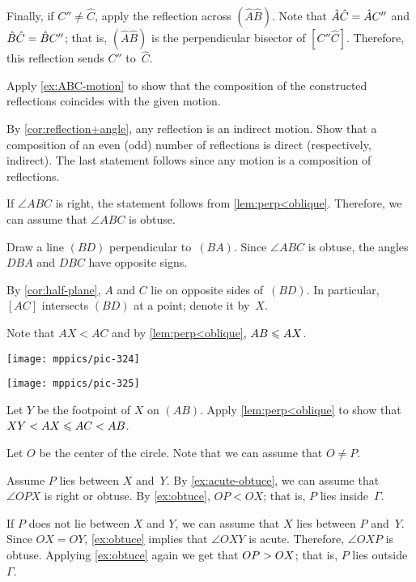 Finally, if $C''\ne \hat C$, apply the reflection across $(\hat A\hat B)$.
Note that $\hat A\hat C=\hat AC''$ and $\hat B\hat C=\hat BC''$;
that is, $(\hat A\hat B)$ is the perpendicular bisector of $[C''\hat C]$.
Therefore, this reflection sends $C''$ to~$\hat C$.

Apply \ref{ex:ABC-motion} to show that the composition of the constructed reflections coincides with the given motion.

By \ref{cor:reflection+angle}, any reflection is an indirect motion.
Show that a composition of an even (odd) number of reflections is direct (respectively, indirect).
The last statement follows since any motion is a composition of reflections.

If $\angle ABC$ is right, the statement follows from \ref{lem:perp<oblique}.
Therefore, we can assume that $\angle ABC$ is obtuse.

Draw a line $(BD)$ perpendicular to~$(BA)$.
Since $\angle ABC$ is obtuse, 
the angles $DBA$ and $DBC$ have opposite signs.

By \ref{cor:half-plane},
$A$ and $C$ lie on opposite sides of~$(BD)$.
In particular, $[AC]$ intersects $(BD)$ at a point; denote it by~$X$.

Note that $AX<AC$ and by \ref{lem:perp<oblique}, $AB\leqslant AX$.

\begin{Figure}
\vskip-0mm
\begin{minipage}{.49\textwidth}
\centering
\texttt{[image: mppics/pic-324]}
\end{minipage}
\hfill
\begin{minipage}{.49\textwidth}
\centering
\texttt{[image: mppics/pic-325]}
\end{minipage}
\end{Figure}

Let $Y$ be the footpoint of $X$ on $(AB)$.
Apply \ref{lem:perp<oblique} to show that 
$XY<AX\leqslant AC<AB$.

Let $O$ be the center of the circle.
Note that we can assume that $O\ne P$.


Assume $P$ lies between $X$ and~$Y$.
By \ref{ex:acute-obtuce}, we can assume that $\angle OPX$ is right or obtuse.
By \ref{ex:obtuce}, $OP<OX$; 
that is, $P$ lies inside~$\Gamma$.

If $P$ does not lie between $X$ and $Y$, we can assume that $X$ lies between $P$ and~$Y$.
Since $OX=OY$, \ref{ex:obtuce} implies that $\angle OXY$ is acute.
Therefore, $\angle OXP$ is obtuse.
Applying \ref{ex:obtuce} again we get that $OP>OX$;
that is, $P$ lies outside~$\Gamma$.

